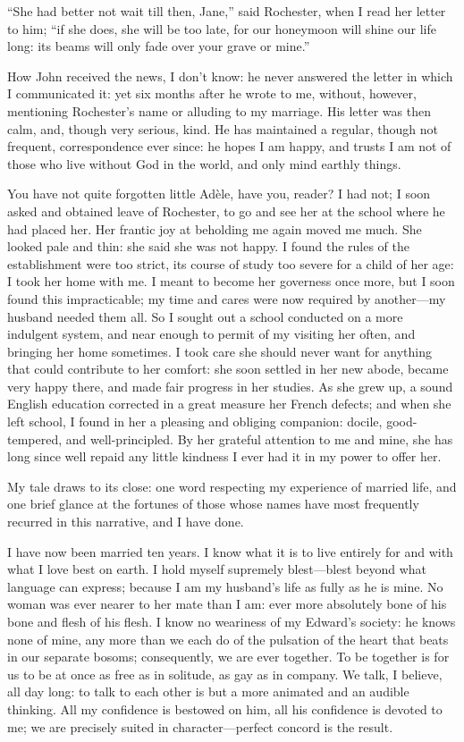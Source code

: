 \enquote{She had better not wait till then, Jane,} said \Mr{} Rochester,
when I read her letter to him; \enquote{if she does, she will be too
	late, for our honeymoon will shine our life long: its beams will only
	fade over your grave or mine.}

How \St{} John received the news, I don't know: he never answered the
letter in which I communicated it: yet six months after he wrote to me,
without, however, mentioning \Mr{} Rochester's name or alluding to my
marriage. His letter was then calm, and, though very serious, kind. He
has maintained a regular, though not frequent, correspondence ever
since: he hopes I am happy, and trusts I am not of those who live
without God in the world, and only mind earthly things.

You have not quite forgotten little Adèle, have you, reader? I had not;
I soon asked and obtained leave of \Mr{} Rochester, to go and see her at
the school where he had placed her. Her frantic joy at beholding me
again moved me much. She looked pale and thin: she said she was not
happy. I found the rules of the establishment were too strict, its
course of study too severe for a child of her age: I took her home with
me. I meant to become her governess once more, but I soon found this
impracticable; my time and cares were now required by another---my
husband needed them all. So I sought out a school conducted on a more
indulgent system, and near enough to permit of my visiting her often,
and bringing her home sometimes. I took care she should never want for
anything that could contribute to her comfort: she soon settled in her
new abode, became very happy there, and made fair progress in her
studies. As she grew up, a sound English education corrected in a great
measure her French defects; and when she left school, I found in her a
pleasing and obliging companion: docile, good-tempered, and
well-principled. By her grateful attention to me and mine, she has long
since well repaid any little kindness I ever had it in my power to offer
her.

My tale draws to its close: one word respecting my experience of married
life, and one brief glance at the fortunes of those whose names have
most frequently recurred in this narrative, and I have done.

I have now been married ten years. I know what it is to live entirely
for and with what I love best on earth. I hold myself supremely
blest---blest beyond what language can express; because I am my
husband's life as fully as he is mine. No woman was ever nearer to her
mate than I am: ever more absolutely bone of his bone and flesh of his
flesh. I know no weariness of my Edward's society: he knows none of
mine, any more than we each do of the pulsation of the heart that beats
in our separate bosoms; consequently, we are ever together. To be
together is for us to be at once as free as in solitude, as gay as in
company. We talk, I believe, all day long: to talk to each other is but
a more animated and an audible thinking. All my confidence is bestowed
on him, all his confidence is devoted to me; we are precisely suited in
character---perfect concord is the result.

